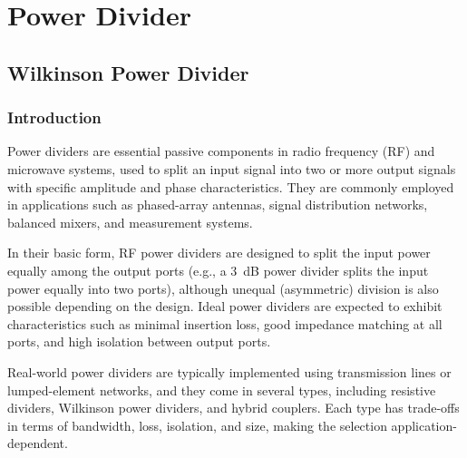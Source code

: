 %

\graphicspath{{figures/}}

\chapter{Power Divider}

\section{Wilkinson Power Divider}

\subsection{Introduction}

Power dividers are essential passive components in radio frequency (RF) and microwave systems, used to split an input signal into two or more output signals with specific amplitude and phase characteristics. They are commonly employed in applications such as phased-array antennas, signal distribution networks, balanced mixers, and measurement systems.

In their basic form, RF power dividers are designed to split the input power equally among the output ports (e.g., a 3~dB power divider splits the input power equally into two ports), although unequal (asymmetric) division is also possible depending on the design. Ideal power dividers are expected to exhibit characteristics such as minimal insertion loss, good impedance matching at all ports, and high isolation between output ports.

Real-world power dividers are typically implemented using transmission lines or lumped-element networks, and they come in several types, including resistive dividers, Wilkinson power dividers, and hybrid couplers. Each type has trade-offs in terms of bandwidth, loss, isolation, and size, making the selection application-dependent.

